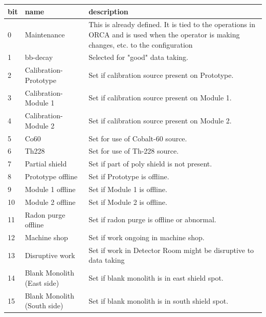 \documentclass[/main.tex]{subfiles}
\begin{document}
\begin{tabular}{| l | l | p{} |} \hline
  bit & name & description \\ \hline\hline
  0  & Maintenance           & This is already defined. It is tied to the operations in ORCA and is used when the operator is making changes, etc. to the configuration \\ \hline
  1  & bb-decay              & Selected for "good" data taking. \\ \hline
  2  & Calibration-Prototype & Set if calibration source present on Prototype. \\ \hline
  3  & Calibration-Module 1  & Set if calibration source present	
  on Module 1. \\ \hline\hline
  4  & Calibration-Module 2  & Set if calibration source present on Module 2. \\ \hline
  5  & Co60                  & Set for use of Cobalt-60 source. \\ \hline
  6  & Th228                 & Set for use of Th-228 source. \\ \hline
  7  & Partial shield        & Set if part of poly shield is not present. \\ \hline\hline
  8  & Prototype offline     & Set if Prototype is offline. \\ \hline
  9  & Module 1 offline      & Set if Module 1 is offline. \\ \hline
  10 & Module 2 offline      & Set if Module 2 is offline. \\ \hline
  11 & Radon purge offline   & Set if radon purge is offline or abnormal. \\ \hline\hline
  12 & Machine shop          & Set if work ongoing in machine shop. \\ \hline
  13 & Disruptive work       & Set if work in Detector Room might be disruptive to data taking \\ \hline
  14 & Blank Monolith (East side) & Set if blank monolith is in east shield spot. \\ \hline
  15 & Blank Monolith (South side)& Set if blank monolith is in south shield spot. \\ \hline
\end{tabular}
\par
\end{document}
